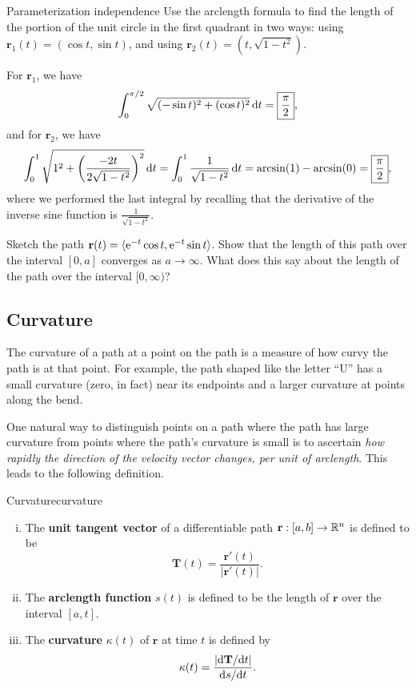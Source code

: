 \documentclass{watsonbook}
\begin{document}
\begin{example}{Parameterization independence}{}
  Use the arclength formula to find the length of the portion of the
  unit circle in the first quadrant in two ways: using $\mathbf{r}_1(t)
  = (\cos t, \sin t)$, and using $\mathbf{r}_2(t) = (t,\sqrt{1-t^2})$. 
\end{example}

\begin{solution}
  For $\mathbf{r}_1$, we have 
  \[
    \int_0^{\pi/2} \sqrt{(-\sin t)^2 + (\cos t)^2} \, \mathrm{d} t = \boxed{\frac{\pi}{2}}, 
  \]
  and for $\mathbf{r}_2$, we have
  \[
    \int_0^1 \sqrt{1^2 + \left(\frac{-2t}{2\sqrt{1-t^2}}\right)^2}\, \mathrm{d}
    t =  \int_0^1 \frac{1}{\sqrt{1-t^2}} \, \mathrm{d} t = \arcsin(1) -
    \arcsin(0) = \boxed{\frac{\pi}{2}}, 
  \]
  where we performed the last integral by recalling that the
  derivative of the inverse sine function is
  $\frac{1}{\sqrt{1-t^2}}$. 
\end{solution}

\begin{exercise}{}{}
  Sketch the path
  $\mathbf{r}(t) = \langle \operatorname{e}^{-t} \cos t, \operatorname{e}^{-t} \sin t \rangle$. Show
  that the length of this path over the interval $[0,a]$ converges as
  $a\to\infty$. What does this say about the length of the path over
  the interval $[0,\infty)$?
\end{exercise}

\subsection{Curvature} 

The curvature of a path at a point on the path is a measure of how
curvy the path is at that point. For example, the path shaped like the
letter ``\textsf{U}'' has a small curvature (zero, in fact) near its
endpoints and a larger curvature at points along the bend.

One natural way to distinguish points on a path where the path has
large curvature from points where the path's curvature is small is to
ascertain \textit{how rapidly the direction of the velocity vector
  changes, per unit of arclength}. This leads to the following
definition.

\begin{defn}[breakable]{Curvature}{curvature}
  \begin{enumerate}[(i),leftmargin=12pt,topsep=-6pt,itemsep=4pt]
  \item The \textbf{unit tangent vector} of a differentiable path $\mathbf{r}:[a,b]
    \to \mathbb{R}^n$ is defined to be
    \[
      \mathbf{T}(t) = \frac{\mathbf{r}'(t)}{|\mathbf{r}'(t)|}. 
    \]
  \item The \textbf{arclength function} $s(t)$ is defined to be the length
    of $\mathbf{r}$ over the interval $[a,t]$.
  \item The \textbf{curvature} $\kappa(t)$ of $\mathbf{r}$ at time $t$ is
    defined by
    \[
      \mathbf{\kappa}(t) = \frac{|\mathrm{d}\mathbf{T}/\mathrm{d} t|}{\mathrm{d} s/\mathrm{d} t}. 
    \]
  \end{enumerate}
\end{defn}
\end{document}
